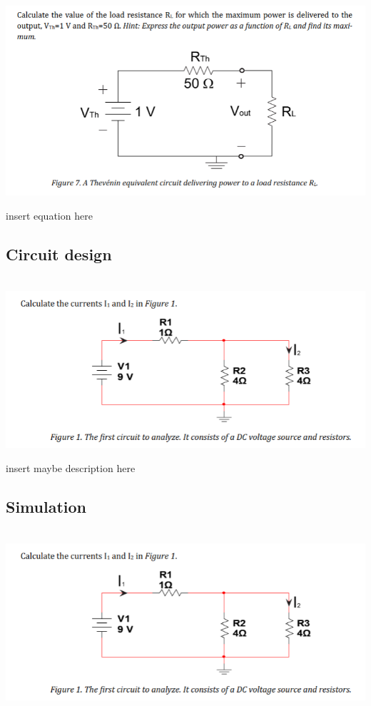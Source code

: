 \documentclass[11pt]{article}
\begin{document}
\includegraphics[width=\linewidth]{5.1 calculations.png}


\noindent
insert equation here

\subsection[25pt]{\bf{Circuit design}}

\noindent
\\
\includegraphics[width=\linewidth]{1.1 calculation.png}

insert maybe description here

\subsection[25pt]{\bf{Simulation}}

\noindent
\\
\includegraphics[width=\linewidth]{1.1 calculation.png}
\end{document}
